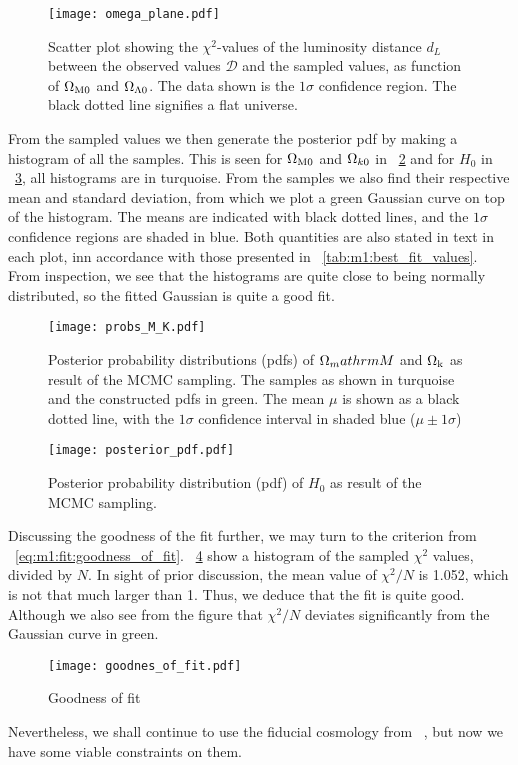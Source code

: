     \begin{figure}
        \texttt{[image: omega\_plane.pdf]}
        \caption{Scatter plot showing the $\chi^2$-values of the luminosity distance $d_L$ between the observed values $\mathcal{D}$ and the sampled values, as function of $\Omega_\mathrm{M0}$ and $\Omega_{\Lambda0}$. The data shown is the $1\sigma$ confidence region. The black dotted line signifies a flat universe. }
        \label{fig:m1:omega_planes}
    \end{figure}
    
    From the sampled values we then generate the posterior pdf by making a histogram of all the samples. This is seen for $\Omega_\mathrm{M0}$ and $\Omega_{k0}$ in ~\cref{fig:m1:posterior_pdf_omega_m_k} and for $H_0$ in ~\cref{fig:m1:posterior_pdf_H0}, all histograms are in turquoise. From the samples we also find their respective mean and standard deviation, from which we plot a green Gaussian curve on top of the histogram. The means are indicated with black dotted lines, and the $1\sigma$ confidence regions are shaded in blue. Both quantities are also stated in text in each plot, inn accordance with those presented in ~\cref{tab:m1:best_fit_values}. From inspection, we see that the histograms are quite close to being normally distributed, so the fitted Gaussian is quite a good fit. 
    
    \begin{figure}
        \texttt{[image: probs\_M\_K.pdf]}
        \caption{Posterior probability distributions (pdfs) of $\Omega_mathrm{M}$ and $\Omega_\mathrm{k}$ as result of the MCMC sampling. The samples as shown in turquoise and the constructed pdfs in green. The mean $\mu$ is shown as a black dotted line, with the $1\sigma$ confidence interval in shaded blue ($\mu\pm 1\sigma$)}
        \label{fig:m1:posterior_pdf_omega_m_k}
    \end{figure}
    
    \begin{figure}
        \texttt{[image: posterior\_pdf.pdf]}
        \caption{Posterior probability distribution (pdf) of $H_0$ as result of the MCMC sampling.}
        \label{fig:m1:posterior_pdf_H0}
    \end{figure}

    Discussing the goodness of the fit further, we may turn to the criterion from ~\cref{eq:m1:fit:goodness_of_fit}. ~\cref{fig:m1:goodness_of_fit} show a histogram of the sampled $\chi^2$ values, divided by $N$. In sight of prior discussion, the mean value of $\chi^2/N$ is 1.052, which is not that much larger than 1. Thus, we deduce that the fit is quite good. Although we also see from the figure that $\chi^2/N$ deviates significantly from the Gaussian curve in green.  
    
    \begin{figure}
        \texttt{[image: goodnes\_of\_fit.pdf]}
        \caption{Goodness of fit}
        \label{fig:m1:goodness_of_fit}
    \end{figure}

    Nevertheless, we shall continue to use the fiducial cosmology from ~\cite{Betoule_2014}, but now we have some viable constraints on them. 
    